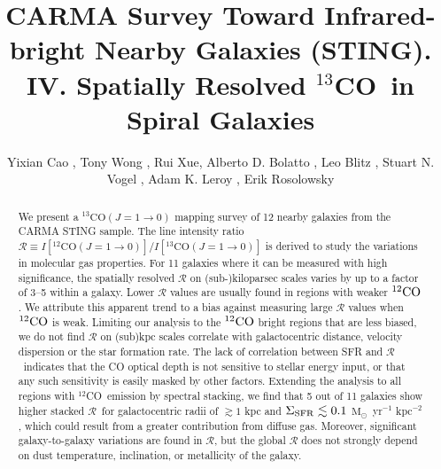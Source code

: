 \documentclass{emulateapj}
\def\ttco{\mbox{$^{13}$CO}}
\def\twco{\mbox{$^{12}$CO}}
\def\rtt{$\mathcal{R}$}
\def\Msun{$\mathrm{M_{\odot}}$}
\begin{document}

\title{CARMA Survey Toward Infrared-bright Nearby Galaxies
  (STING). IV. Spatially Resolved \ttco \ in Spiral Galaxies}
  
\author{
Yixian Cao ,
Tony Wong ,
Rui Xue,
Alberto D. Bolatto ,
Leo Blitz ,
Stuart N. Vogel ,
Adam K. Leroy ,
Erik Rosolowsky  
}


\begin{abstract}
We present a  $^{13}\mathrm{CO} (J = 1 \rightarrow 0)$ mapping survey of 12 nearby galaxies from the CARMA STING sample.
The line intensity ratio $\mathcal{R} \equiv I[^{12}\mathrm{CO} (J = 1 \rightarrow 0)]/I[^{13}\mathrm{CO} (J = 1 \rightarrow 0)]$ is derived to study the variations in molecular gas properties.
For 11 galaxies where it can be measured with high significance,
the spatially resolved $\mathcal{R}$ on (sub-)kiloparsec scales
varies by up to a factor of 3--5 within a galaxy.
Lower $\mathcal{R}$ values are usually found in regions with weaker $^{12}\rm CO$.
We attribute this apparent trend to a bias against measuring
large $\mathcal{R}$ values when $^{12}\rm CO$ is weak.
Limiting our analysis to the $^{12}\rm CO$ bright regions that are less biased, we do not find $\mathcal{R}$ on (sub)kpc scales correlate with galactocentric distance, velocity dispersion or the star formation rate. 
The lack of correlation between SFR and \rtt \ indicates that the CO optical depth is not sensitive to stellar energy input, or that any such sensitivity is easily masked by other factors.
Extending the analysis to all regions with \twco \ emission by spectral stacking, we find that 5 out of 11 galaxies show higher stacked \rtt \ for galactocentric radii of $\gtrsim 1$ kpc and $\Sigma_{\rm SFR} \lesssim 0.1 \ $\Msun\ yr$^{-1}$ kpc$^{-2}$, which could result from a greater contribution from diffuse gas. 
Moreover, significant galaxy-to-galaxy variations are found in $\mathcal{R}$,
but the global $\mathcal{R}$ does not strongly depend on
dust temperature, inclination, or metallicity of the galaxy.

\end{abstract}
  
\end{document}
